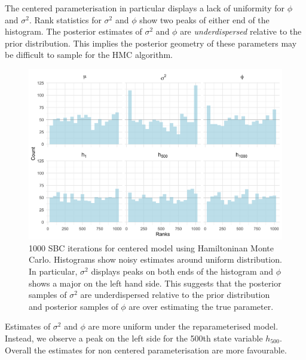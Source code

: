 \documentclass[12pt, a4paper]{article}
\begin{document}
    The centered parameterisation in particular displays a lack of uniformity for $\phi$ and $\sigma^2$. Rank statistics for $\sigma^2$ and $\phi$ show two peaks of either end of the histogram. The posterior estimates of $\sigma^2$ and $\phi$ are \textit{underdispersed} relative to the prior distribution. This implies the posterior geometry of these parameters may be difficult to sample for the HMC algorithm.

    \begin{figure}[H]
        \centering
        \includegraphics[scale=0.09]{results/hmc_cp_1k.png}
        \caption{1000 SBC iterations for centered model using Hamiltoninan Monte Carlo. Histograms show noisy estimates around uniform distribution. In particular, $\sigma^2$ displays peaks on both ends of the histogram and $\phi$ shows a major on the left hand side. This suggests that the posterior samples of $\sigma^2$ are underdispersed relative to the prior distribution and posterior samples of $\phi$ are over estimating the true parameter.}
        \label{fig:cphmc1k}
    \end{figure} 

    Estimates of $\sigma^2$ and $\phi$ are more uniform under the reparameterised model. Instead, we observe a peak on the left side for the 500th state variable $h_{500}$. Overall the estimates for non centered parameterisation are more favourable. 
\end{document}
